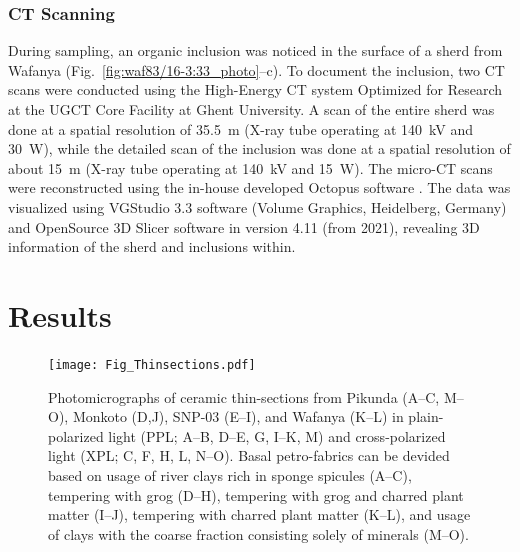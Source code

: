 \documentclass[preprint,10pt,oneside,onecolumn,authoryear]{elsarticle}
\begin{document}
\subsubsection{{\textmu}CT Scanning}

During sampling, an organic inclusion was noticed in the surface of a sherd from Wafanya (Fig.~\ref{fig:waf83/16-3:33_photo}--c). To document the inclusion, two {\textmu}CT scans were conducted using the High-Energy CT system Optimized for Research \citep[HECTOR,][]{Masschaele.2013} at the UGCT Core Facility at Ghent University. A scan of the entire sherd was done at a spatial resolution of 35.5~{\textmu}m (X-ray tube operating at 140~kV and 30~W), while the detailed scan of the inclusion was done at a spatial resolution of about 15~{\textmu}m (X-ray tube operating at 140~kV and 15~W). The micro-CT scans were reconstructed using the in-house developed Octopus software \citep{Vlassenbroeck.2007}. The data was visualized using VGStudio 3.3 software (Volume Graphics, Heidelberg, Germany) and OpenSource 3D Slicer software \citep{Fedorov.2012} in version 4.11 (from 2021), revealing 3D information of the sherd and inclusions within.

\section{Results}

\begin{figure}[p]
	\texttt{[image: Fig\_Thinsections.pdf]}
	\caption{Photomicrographs of ceramic thin-sections from Pikunda (A--C, M--O), Monkoto (D,J), SNP-03 (E--I), and Wafanya (K--L) in plain-polarized light (PPL; A--B, D--E, G, I--K, M) and cross-polarized light (XPL; C, F, H, L, N--O). Basal petro-fabrics can be devided based on usage of river clays rich in sponge spicules (A--C), tempering with grog (D--H), tempering with grog and charred plant matter (I--J), tempering with charred plant matter (K--L), and usage of clays with the coarse fraction consisting solely of minerals (M--O).}
	\label{fig:thinsections}
\end{figure}
\end{document}
